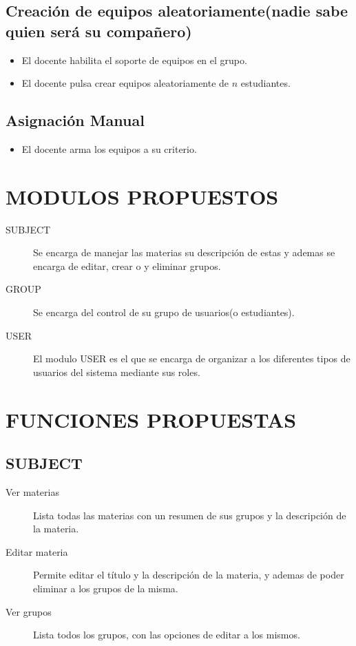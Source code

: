 \documentclass[letterpaper,spanish]{article}
\begin{document}
\subsection{Creaci\'on de equipos aleatoriamente(nadie sabe quien ser\'a su compa\~nero)}
\begin{itemize}
    \item El docente habilita el soporte de equipos en el grupo.
    \item El docente pulsa crear equipos aleatoriamente de $n$ estudiantes.
\end{itemize}

\subsection{Asignaci\'on Manual}
\begin{itemize}
    \item El docente arma los equipos a su criterio.
\end{itemize}

\section{MODULOS PROPUESTOS}

\begin{description}
    \item [SUBJECT] Se encarga de manejar las materias su descripci\'on de estas y ademas se encarga de editar, 
    crear o y eliminar grupos.
    \item [GROUP] Se encarga del control de su grupo de usuarios(o estudiantes).
    \item [USER] El modulo USER es el que se encarga de organizar a los diferentes tipos de usuarios
    del sistema mediante sus roles.
\end{description}

\section{FUNCIONES PROPUESTAS}
    \subsection{SUBJECT}
        \begin{description}
            \item [Ver materias] Lista todas las materias con un resumen de sus grupos y la descripci\'on de la 
            materia.
            \item [Editar materia] Permite editar el t\'itulo y la descripci\'on de la materia, y ademas de poder 
            eliminar a los grupos de la misma.
            \item [Ver grupos] Lista todos los grupos, con las opciones de editar a los mismos.
        \end{description}
    
\end{document}
